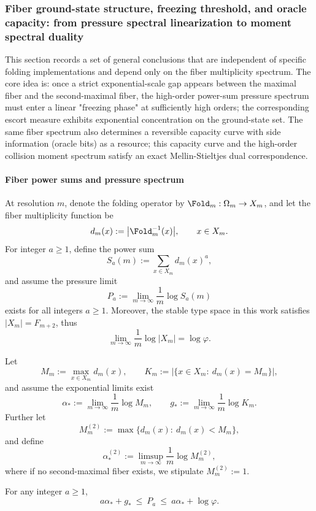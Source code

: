 
\subsubsection{Fiber ground-state structure, freezing threshold, and oracle capacity: from pressure spectral linearization to moment spectral duality}\label{subsubsec:fold-fiber-groundstate-freezing-oracle-capacity}
This section records a set of general conclusions that are independent of specific folding implementations and depend only on the fiber multiplicity spectrum.
The core idea is: once a strict exponential-scale gap appears between the maximal fiber and the second-maximal fiber, the high-order power-sum pressure spectrum must enter a linear "freezing phase" at sufficiently high orders; the corresponding escort measure exhibits exponential concentration on the ground-state set.
The same fiber spectrum also determines a reversible capacity curve with side information (oracle bits) as a resource; this capacity curve and the high-order collision moment spectrum satisfy an exact Mellin-Stieltjes dual correspondence.

\paragraph{Fiber power sums and pressure spectrum}
At resolution \(m\), denote the folding operator by \(\Fold_m:\Omega_m\to X_m\), and let the fiber multiplicity function be
\[
d_m(x):=\bigl|\Fold_m^{-1}(x)\bigr|,
\qquad x\in X_m.
\]
For integer \(a\ge 1\), define the power sum
\[
S_a(m):=\sum_{x\in X_m} d_m(x)^a,
\]
and assume the pressure limit
\[
P_a:=\lim_{m\to\infty}\frac{1}{m}\log S_a(m)
\]
exists for all integers \(a\ge 1\).
Moreover, the stable type space in this work satisfies \(|X_m|=F_{m+2}\), thus
\[
\lim_{m\to\infty}\frac{1}{m}\log|X_m|=\log\varphi.
\]

Let
\[
M_m:=\max_{x\in X_m} d_m(x),
\qquad
K_m:=\bigl|\{x\in X_m:\ d_m(x)=M_m\}\bigr|,
\]
and assume the exponential limits exist
\[
\alpha_*:=\lim_{m\to\infty}\frac{1}{m}\log M_m,
\qquad
g_*:=\lim_{m\to\infty}\frac{1}{m}\log K_m.
\]
Further let
\[
M_m^{(2)}:=\max\{d_m(x):\ d_m(x)<M_m\},
\]
and define
\[
\alpha_*^{(2)}:=\limsup_{m\to\infty}\frac{1}{m}\log M_m^{(2)},
\]
where if no second-maximal fiber exists, we stipulate \(M_m^{(2)}:=1\).

\begin{theorem}\label{thm:fold-pressure-groundstate-bounds}
For any integer \(a\ge 1\),
\[
a\alpha_*+g_*\ \le\ P_a\ \le\ a\alpha_*+\log\varphi.
\]
\end{theorem}

